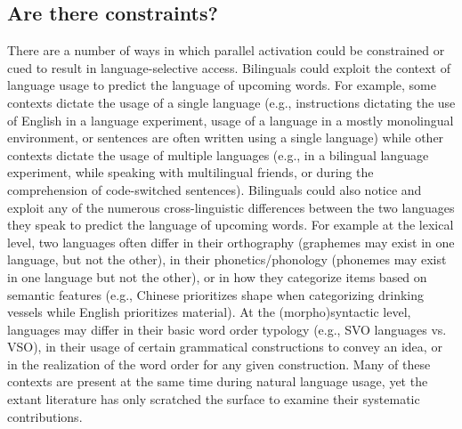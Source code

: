 \subsection{Are there constraints?}
\label{arethereconstraints}

There are a number of ways in which parallel activation could be constrained or cued to result in language-selective access. Bilinguals could exploit the context of language usage to predict the language of upcoming words. For example, some contexts dictate the usage of a single language (e.g., instructions dictating the use of English in a language experiment, usage of a language in a mostly monolingual environment, or sentences are often written using a single language) while other contexts dictate the usage of multiple languages (e.g., in a bilingual language experiment, while speaking with multilingual friends, or during the comprehension of code-switched sentences). Bilinguals could also notice and exploit any of the numerous cross-linguistic differences between the two languages they speak to predict the language of upcoming words. For example at the lexical level, two languages often differ in their orthography (graphemes may exist in one language, but not the other), in their phonetics\slash phonology (phonemes may exist in one language but not the other), or in how they categorize items based on semantic features (e.g., Chinese prioritizes shape when categorizing drinking vessels while English prioritizes material). At the (morpho)syntactic level, languages may differ in their basic word order typology (e.g., SVO languages vs. VSO), in their usage of certain grammatical constructions to convey an idea, or in the realization of the word order for any given construction. Many of these contexts are present at the same time during natural language usage, yet the extant literature has only scratched the surface to examine their systematic contributions.

